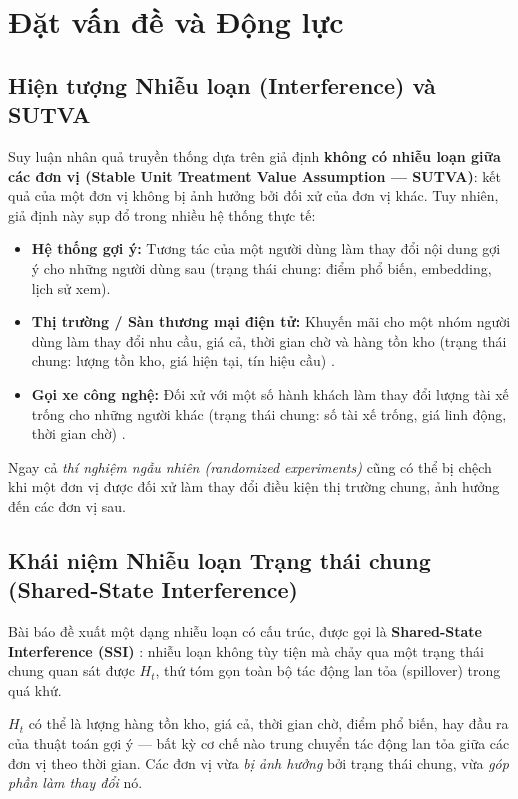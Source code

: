 \section{Đặt vấn đề và Động lực}

\subsection{Hiện tượng Nhiễu loạn (Interference) và SUTVA}

Suy luận nhân quả truyền thống dựa trên giả định \textbf{không có nhiễu loạn giữa các đơn vị (Stable Unit Treatment Value Assumption --- SUTVA)}: kết quả của một đơn vị không bị ảnh hưởng bởi đối xử của đơn vị khác. Tuy nhiên, giả định này sụp đổ trong nhiều hệ thống thực tế:

\begin{itemize}
    \item \textbf{Hệ thống gợi ý:} Tương tác của một người dùng làm thay đổi nội dung gợi ý cho những người dùng sau (trạng thái chung: điểm phổ biến, embedding, lịch sử xem).
    \item \textbf{Thị trường / Sàn thương mại điện tử:} Khuyến mãi cho một nhóm người dùng làm thay đổi nhu cầu, giá cả, thời gian chờ và hàng tồn kho (trạng thái chung: lượng tồn kho, giá hiện tại, tín hiệu cầu) \cite{johari2022experimental}.
    \item \textbf{Gọi xe công nghệ:} Đối xử với một số hành khách làm thay đổi lượng tài xế trống cho những người khác (trạng thái chung: số tài xế trống, giá linh động, thời gian chờ) \cite{johari2022experimental}.
\end{itemize}

Ngay cả \textit{thí nghiệm ngẫu nhiên (randomized experiments)} cũng có thể bị chệch khi một đơn vị được đối xử làm thay đổi điều kiện thị trường chung, ảnh hưởng đến các đơn vị sau.

\subsection{Khái niệm Nhiễu loạn Trạng thái chung (Shared-State Interference)}

Bài báo đề xuất một dạng nhiễu loạn có cấu trúc, được gọi là \textbf{Shared-State Interference (SSI)} \cite{hays2025double}: nhiễu loạn không tùy tiện mà chảy qua một trạng thái chung quan sát được \(H_t\), thứ tóm gọn toàn bộ tác động lan tỏa (spillover) trong quá khứ.

\(H_t\) có thể là lượng hàng tồn kho, giá cả, thời gian chờ, điểm phổ biến, hay đầu ra của thuật toán gợi ý --- bất kỳ cơ chế nào trung chuyển tác động lan tỏa giữa các đơn vị theo thời gian. Các đơn vị vừa \textit{bị ảnh hưởng} bởi trạng thái chung, vừa \textit{góp phần làm thay đổi} nó.

